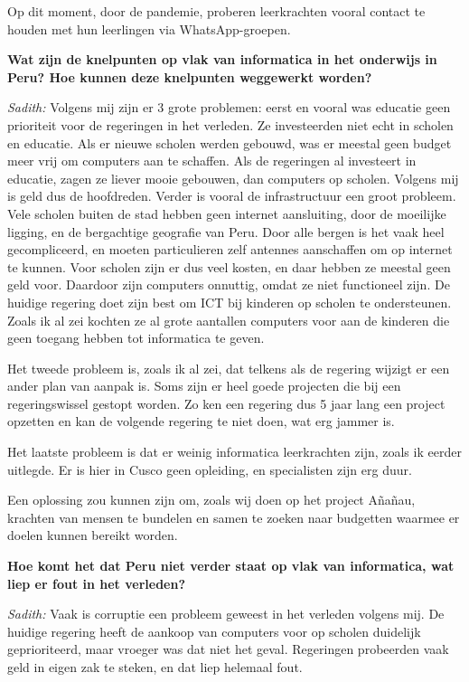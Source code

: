 Op dit moment, door de pandemie, proberen leerkrachten vooral contact te houden met hun leerlingen via WhatsApp-groepen.

\textbf{Wat zijn de knelpunten op vlak van informatica in het onderwijs in Peru? Hoe kunnen deze knelpunten weggewerkt worden?}

\textit{Sadith:} Volgens mij zijn er 3 grote problemen: eerst en vooral was educatie geen prioriteit voor de regeringen in het verleden. Ze investeerden niet echt in scholen en educatie. Als er nieuwe scholen werden gebouwd, was er meestal geen budget meer vrij om computers aan te schaffen. Als de regeringen al investeert in educatie, zagen ze liever mooie gebouwen, dan computers op scholen. Volgens mij is geld dus de hoofdreden. Verder is vooral de infrastructuur een groot probleem. Vele scholen buiten de stad hebben geen internet aansluiting, door de moeilijke ligging, en de bergachtige geografie van Peru. Door alle bergen is het vaak heel gecompliceerd, en moeten particulieren zelf antennes aanschaffen om op internet te kunnen. Voor scholen zijn er dus veel kosten, en daar hebben ze meestal geen geld voor. Daardoor zijn computers onnuttig, omdat ze niet functioneel zijn. De huidige regering doet zijn best om ICT bij kinderen op scholen te ondersteunen. Zoals ik al zei kochten ze al grote aantallen computers voor aan de kinderen die geen toegang hebben tot informatica te geven.

Het tweede probleem is, zoals ik al zei, dat telkens als de regering wijzigt er een ander plan van aanpak is. Soms zijn er heel goede projecten die bij een regeringswissel gestopt worden. Zo ken een regering dus 5 jaar lang een project opzetten en kan de volgende regering te niet doen, wat erg jammer is. 

Het laatste probleem is dat er weinig informatica leerkrachten zijn, zoals ik eerder uitlegde. Er is hier in Cusco geen opleiding, en specialisten zijn erg duur.

Een oplossing zou kunnen zijn om, zoals wij doen op het project Añañau, krachten van mensen te bundelen en samen te zoeken naar budgetten waarmee er doelen kunnen bereikt worden. 

\textbf{Hoe komt het dat Peru niet verder staat op vlak van informatica, wat liep er fout in het verleden?}

\textit{Sadith:} Vaak is corruptie een probleem geweest in het verleden volgens mij. De huidige regering heeft de aankoop van computers voor op scholen duidelijk geprioriteerd, maar vroeger was dat niet het geval. Regeringen probeerden vaak geld in eigen zak te steken, en dat liep helemaal fout. 
 
